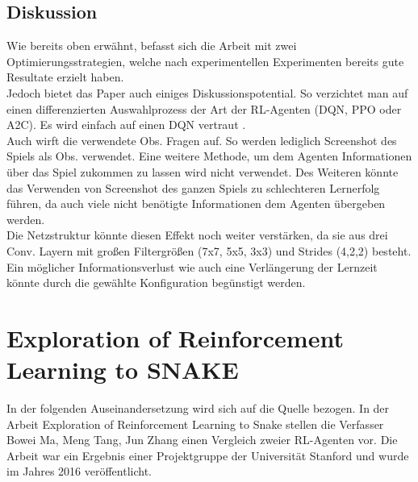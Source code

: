 \subsection{Diskussion}
Wie bereits oben erwähnt, befasst sich die Arbeit mit zwei Optimierungsstrategien, welche nach experimentellen Experimenten bereits gute Resultate erzielt haben.\\
Jedoch bietet das Paper auch einiges Diskussionspotential. So verzichtet man auf einen differenzierten Auswahlprozess der Art der RL-Agenten (DQN, PPO oder A2C). Es wird einfach auf einen DQN vertraut \cite[Kapitel 1]{Autonomous_Agents_in_Snake_Game_via_DRL}.\\
Auch wirft die verwendete Obs. Fragen auf. So werden lediglich Screenshot des Spiels als Obs. verwendet. Eine weitere Methode, um dem Agenten Informationen über das Spiel zukommen zu lassen wird nicht verwendet. Des Weiteren könnte das Verwenden von Screenshot des ganzen Spiels zu schlechteren Lernerfolg führen, da auch viele nicht benötigte Informationen dem Agenten übergeben werden.\\ 
Die Netzstruktur könnte diesen Effekt noch weiter verstärken, da sie aus drei Conv. Layern mit großen Filtergrößen (7x7, 5x5, 3x3) und Strides (4,2,2) besteht. Ein möglicher Informationsverlust wie auch eine Verlängerung der Lernzeit könnte durch die gewählte Konfiguration begünstigt werden.\\

\section{Exploration of Reinforcement Learning to SNAKE} \label{sec:Paper_2}
In der folgenden Auseinandersetzung wird sich auf die Quelle \cite{Exploration_of_Reinforcement_Learning_to_SNAKE} bezogen.
In der Arbeit Exploration of Reinforcement Learning to Snake stellen die Verfasser Bowei Ma, Meng Tang, Jun Zhang einen Vergleich zweier RL-Agenten vor. Die Arbeit war ein Ergebnis einer Projektgruppe der Universität Stanford und wurde im Jahres 2016 veröffentlicht.

